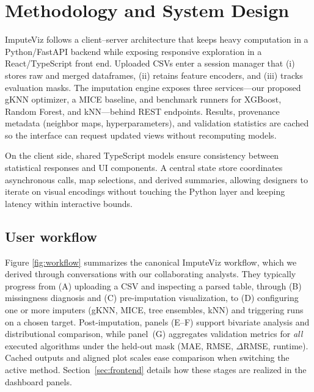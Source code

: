 \documentclass{egpubl}
\newcommand{\gknn}{gKNN\xspace}
\newcommand{\mice}{MICE\xspace}
\newcommand{\tool}{ImputeViz\xspace}
\begin{document}
\section{Methodology and System Design}
\label{sec:method}

\tool follows a client--server architecture that keeps heavy computation in a Python/FastAPI backend while exposing responsive exploration in a React/TypeScript front end. Uploaded CSVs enter a session manager that (i) stores raw and merged dataframes, (ii) retains feature encoders, and (iii) tracks evaluation masks. The imputation engine exposes three services---our proposed \gknn{} optimizer, a \mice{} baseline, and benchmark runners for XGBoost, Random Forest, and kNN---behind REST endpoints. Results, provenance metadata (neighbor maps, hyperparameters), and validation statistics are cached so the interface can request updated views without recomputing models.

On the client side, shared TypeScript models ensure consistency between statistical responses and UI components. A central state store coordinates asynchronous calls, map selections, and derived summaries, allowing designers to iterate on visual encodings without touching the Python layer and keeping latency within interactive bounds.


\subsection{User workflow}
\label{Uworkflow}
Figure \ref{fig:workflow} summarizes the canonical ImputeViz workflow, which we derived through conversations with our collaborating analysts. They typically progress from (A) uploading a CSV and inspecting a parsed table, through (B) missingness diagnosis and (C) pre-imputation visualization, to (D) configuring one or more imputers (gKNN, \mice, tree ensembles, kNN) and triggering runs on a chosen target. Post-imputation, panels (E--F) support bivariate analysis and distributional comparison, while panel~(G) aggregates validation metrics for \emph{all} executed algorithms under the held-out mask (MAE, RMSE, $\Delta$RMSE, runtime). Cached outputs and aligned plot scales ease comparison when switching the active method. Section~\ref{sec:frontend} details how these stages are realized in the dashboard panels.
\end{document}
